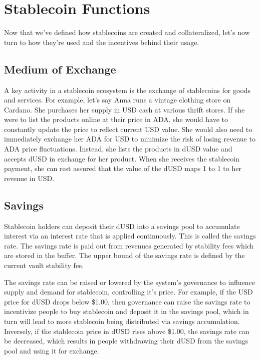 \documentclass[12pt]{article}
\begin{document}
\section{Stablecoin Functions}

Now that we've defined how stablecoins are created and collateralized, let's now turn to how they're used and the incentives behind their usage.

\subsection{Medium of Exchange}

A key activity in a stablecoin ecosystem is the exchange of stablecoins for goods and services. For example, let's say Anna runs a vintage clothing store on Cardano. She purchases her supply in USD cash at various thrift stores. If she were to list the products online at their price in ADA, she would have to constantly update the price to reflect current USD value. She would also need to immediately exchange her ADA for USD to minimize the risk of losing revenue to ADA price fluctuations. Instead, she lists the products in dUSD value and accepts dUSD in exchange for her product. When she receives the stablecoin payment, she can rest assured that the value of the dUSD maps 1 to 1 to her revenue in USD.

\subsection{Savings}
Stablecoin holders can deposit their dUSD into a savings pool to accumulate interest via an interest rate that is applied continuously. This is called the savings rate. The savings rate is paid out from revenues generated by stability fees which are stored in the buffer. The upper bound of the savings rate is defined by the current vault stability fee.

The savings rate can be raised or lowered by the system's governance to influence supply and demand for stablecoin, controlling it's price. For example, if the USD price for dUSD drops below \$1.00, then governance can raise the savings rate to incentivize people to buy stablecoin and deposit it in the savings pool, which in turn will lead to more stablecoin being distributed via savings accumulation. Inversely, if the stablecoin price in dUSD rises above \$1.00, the savings rate can be decreased, which results in people withdrawing their dUSD from the savings pool and using it for exchange.
\end{document}
